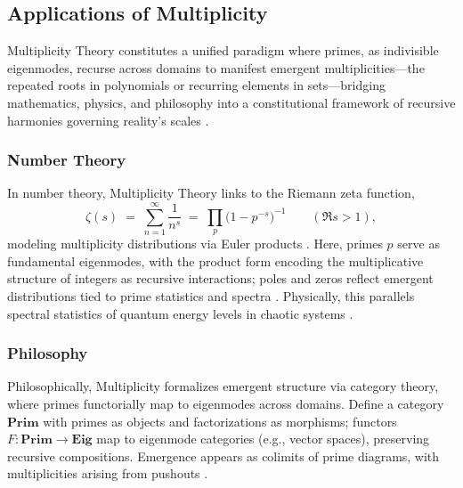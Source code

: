 \documentclass{article}
\theoremstyle{plain}
\begin{document}
\begin{enumerate}
\section{Applications of Multiplicity}

Multiplicity Theory constitutes a unified paradigm where primes, as indivisible eigenmodes, recurse across domains to manifest emergent multiplicities—the repeated roots in polynomials or recurring elements in sets—bridging mathematics, physics, and philosophy into a constitutional framework of recursive harmonies governing reality's scales \citep{HardyWright2008,MacLane1998,Awodey2010}.

\subsubsection{Number Theory}
In number theory, Multiplicity Theory links to the Riemann zeta function,
\begin{equation}
\zeta(s) \;=\; \sum_{n=1}^\infty \frac{1}{n^{s}} \;=\; \prod_{p} \bigl(1-p^{-s}\bigr)^{-1} \qquad (\Re s>1),
\end{equation}
modeling multiplicity distributions via Euler products \citep{Apostol1976,Titchmarsh1986,Davenport2000}. Here, primes $p$ serve as fundamental eigenmodes, with the product form encoding the multiplicative structure of integers as recursive interactions; poles and zeros reflect emergent distributions tied to prime statistics and spectra \citep{Montgomery1973,BerryKeating1999,Edwards1974}. Physically, this parallels spectral statistics of quantum energy levels in chaotic systems \citep{Mehta2004,BohigasGiannoniSchmit1984}.


\subsubsection{Philosophy}
Philosophically, Multiplicity formalizes emergent structure via category theory, where primes functorially map to eigenmodes across domains. Define a category $\mathbf{Prim}$ with primes as objects and factorizations as morphisms; functors $F\!:\mathbf{Prim}\to\mathbf{Eig}$ map to eigenmode categories (e.g., vector spaces), preserving recursive compositions. Emergence appears as colimits of prime diagrams, with multiplicities arising from pushouts \citep{MacLane1998,Lawvere1963,Awodey2010}.




\end{enumerate}
\end{document}
